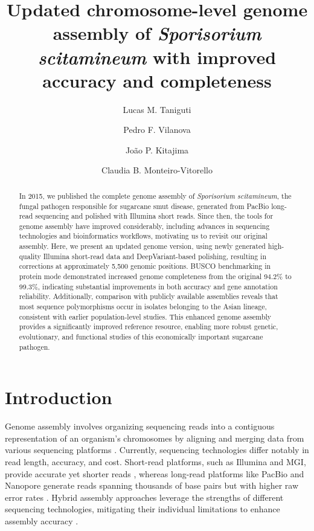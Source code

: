 \documentclass[Journal,letterpaper]{ascelike-new}
\begin{document}
\title{Updated chromosome-level genome assembly of
\textit{Sporisorium scitamineum} with improved accuracy and completeness}

\author[1]{Lucas M. Taniguti}
\author[2]{Pedro F. Vilanova}
\author[1]{João P. Kitajima}
\author[2]{Claudia B. Monteiro-Vitorello }


\maketitle

\begin{abstract}
  In 2015, we published the complete genome assembly of
  \textit{Sporisorium scitamineum}, the fungal pathogen responsible
  for sugarcane smut disease, generated from PacBio
  long-read sequencing and polished with Illumina short reads. Since
  then, the tools for genome assembly have improved considerably,
  including advances in sequencing technologies and bioinformatics
  workflows, motivating us to revisit our original assembly. Here, we
  present an updated genome version, using newly
  generated high-quality Illumina short-read data and
  DeepVariant-based polishing, resulting in
  corrections at approximately 5,500 genomic positions. BUSCO
  benchmarking in protein mode demonstrated increased genome
  completeness from the original 94.2\%
  to 99.3\%, indicating substantial improvements in both accuracy and
  gene annotation reliability. Additionally, comparison with publicly
  available assemblies reveals that most sequence polymorphisms occur
  in isolates belonging to the Asian lineage, consistent with earlier
  population-level studies.
  This enhanced genome assembly provides a significantly improved
  reference resource, enabling more robust genetic, evolutionary, and
  functional studies of this economically important sugarcane pathogen.
\end{abstract}

\section*{Introduction}

Genome assembly involves organizing sequencing reads into a
contiguous representation of an organism's chromosomes by aligning
and merging data from various sequencing platforms
\cite{BASANTANI201733,Baker2012}. Currently, sequencing technologies
differ notably in read length, accuracy, and cost. Short-read
platforms, such as Illumina and MGI, provide accurate yet shorter
reads \cite{giab014}, whereas long-read platforms like PacBio and
Nanopore generate reads spanning thousands of base pairs but with
higher raw error rates \cite{Jain2018,Karst2021}. Hybrid assembly
approaches leverage the strengths of different sequencing
technologies, mitigating their individual limitations to enhance
assembly accuracy \cite{Chen2020}.
\end{document}
